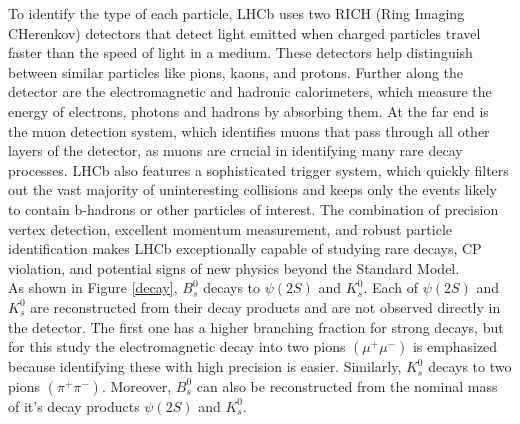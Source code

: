 To identify the type of each particle, LHCb uses two RICH (Ring Imaging CHerenkov) detectors that detect light emitted when charged particles travel faster than the speed of light in a medium. These detectors help distinguish between similar particles like pions, kaons, and protons. Further along the detector are the electromagnetic and hadronic calorimeters, which measure the energy of electrons, photons and hadrons by absorbing them. At the far end is the muon detection system, which identifies muons that pass through all other layers of the detector, as muons are crucial in identifying many rare decay processes. LHCb also features a sophisticated trigger system, which quickly filters out the vast majority of uninteresting collisions and keeps only the events likely to contain b-hadrons or other particles of interest. The combination of precision vertex detection, excellent momentum measurement, and robust particle identification makes LHCb exceptionally capable of studying rare decays, CP violation, and potential signs of new physics beyond the Standard Model.\\



As shown in Figure \ref{decay}, $B_{s}^{0}$ decays to $\psi(2S)$ and $K_{s}^{0}$. Each of $\psi(2S)$ and $K_{s}^{0}$ are reconstructed from their decay products and are not observed directly in the detector. The first one has a higher branching fraction for strong decays, but for this study the electromagnetic decay into two pions $(\mu^{+}\mu^{-})$ is emphasized because identifying these with high precision is easier. Similarly, $K_{s}^{0}$ decays to two pions $(\pi^{+}\pi^{-})$. Moreover, $B_{s}^{0}$ can also be reconstructed from the nominal mass of it's decay products $\psi(2S)$ and $ K_{s}^{0}.$\\

